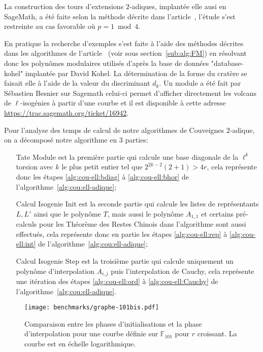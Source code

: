 \documentclass[10pt,a4paper]{book}
\theoremstyle{plain}
\theoremstyle{definition}
\theoremstyle{definition}
\theoremstyle{definition}
\theoremstyle{definition}
\theoremstyle{remark}
\theoremstyle{remark}
\theoremstyle{definition}
\begin{document}
La construction des tours d'extensions $2$-adiques, implantée elle ausi en 
SageMath, a été faite selon la méthode
décrite dans l'article~\cite{Doliskani-Schost15}, l'étude s'est restreinte au 
cas favorable où $p=1 \bmod 4$.

En pratique la recherche d'exemples s'est faite à l'aide des méthodes décrites
dans les algorithmes de l'article~\cite{FouquetMorain02} (voir sous section~\ref{sub:alg:FM}) en résolvant donc les
polynômes modulaires utilisés d'après la base de données "database-kohel" 
implantée par David Kohel. La détermination de la forme du cratère se faisait 
elle à l'aide de la valeur du discriminant $d_k$. Un module a été fait par 
Sébastien Besnier sur Sagemath celui-ci permet d'afficher directement les 
volcans de $\ell$-isogénies à partir d'une courbe et il est disponible à cette 
adresse \url{https://trac.sagemath.org/ticket/16942}. 

Pour l'analyse des temps de calcul de notre algorithmes de Couveignes 
$2$-adique, on a décomposé notre algorithme en 3 parties:
\begin{enumerate}
\item[Tate Module] est la première partie qui calcule une base diagonale de la 
$\ell^k$ torsion avec $k$ le plus petit entier tel que $2^{2k-2}(2+1)> 4r$,
cela représente donc les étapes \ref{alg:cou-ell:bdiag} à \ref{alg:cou-ell:bhor} de l'algorithme~\ref{alg:cou:ell-adique};
\item[Calcul Isogenie Init] est la seconde partie qui calcule les listes de 
représentants $L,L'$ ainsi que le polynôme $T$, mais aussi le polynôme 
$A_{1,1}$ et certains pré-calculs pour les Théorème des Restes Chinois dans 
l'algorithme sont aussi effectués, cela représente donc en partie les étapes 
\ref{alg:cou-ell:rep} à \ref{alg:cou-ell:int} de 
l'algorithme~\ref{alg:cou:ell-adique};
\item[Calcul Isogenie Step] est la troisième partie qui calcule uniquement 
un polynôme d'interpolation $A_{i,j}$ puis l'interpolation de 
Cauchy, cela représente une itération des étapes \ref{alg:cou-ell:ord} à 
\ref{alg:cou-ell:Cauchy} de l'algorithme~\ref{alg:cou:ell-adique}.
\end{enumerate}


\begin{figure}
\texttt{[image: benchmarks/graphe-101bis.pdf]} 
\caption{\label{fig:exp:uni} Comparaison entre les phases d'initialisations et la phase d'interpolation pour une courbe définie sur $\mathbb{F}_{101}$ pour $r$ croissant. La courbe est en échelle logarithmique.}
\end{figure}
\end{document}
